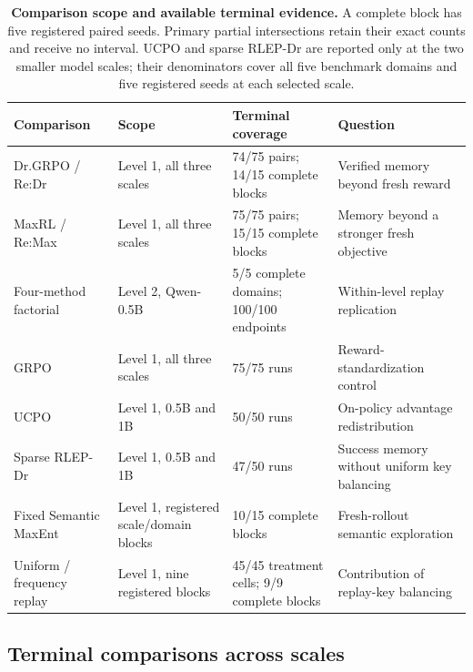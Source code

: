 \documentclass{article}
\newcommand{\1}{\mathbf 1}
\theoremstyle{remark}
\theoremstyle{definition}
\theoremstyle{plain}
\begin{document}
\begin{table}[H]
  \centering
  \caption{\textbf{Comparison scope and available terminal evidence.}
  A complete block has five registered paired seeds. Primary partial
  intersections retain their exact counts and receive no interval.
  UCPO and sparse RLEP-Dr are reported only at the two smaller model scales;
  their denominators cover all five benchmark domains and five registered
  seeds at each selected scale.}
  \label{tab:experiment-map}
  \label{tab:direct-comparators}
  \scriptsize
  \setlength{\tabcolsep}{3pt}
  \begin{tabularx}{\linewidth}{@{}P{.24\linewidth}P{.20\linewidth}P{.22\linewidth}Y@{}}
    \toprule
    \textbf{Comparison} & \textbf{Scope} & \textbf{Terminal coverage}
      & \textbf{Question} \\
    \midrule
    Dr.GRPO / Re:Dr & Level 1, all three scales &
      74/75 pairs; 14/15 complete blocks & Verified memory beyond fresh reward \\
    MaxRL / Re:Max & Level 1, all three scales &
      75/75 pairs; 15/15 complete blocks & Memory beyond a stronger fresh objective \\
    Four-method factorial & Level 2, Qwen-0.5B &
      5/5 complete domains; 100/100 endpoints & Within-level replay replication \\
    GRPO & Level 1, all three scales &
      75/75 runs & Reward-standardization control \\
    UCPO & Level 1, 0.5B and 1B &
      50/50 runs & On-policy advantage redistribution \\
    Sparse RLEP-Dr & Level 1, 0.5B and 1B &
      47/50 runs & Success memory without uniform key balancing \\
    Fixed Semantic MaxEnt & Level 1, registered scale/domain blocks &
      10/15 complete blocks & Fresh-rollout semantic exploration \\
    Uniform / frequency replay & Level 1, nine registered blocks &
      45/45 treatment cells; 9/9 complete blocks & Contribution of replay-key balancing \\
    \bottomrule
  \end{tabularx}
\end{table}


\subsection{Terminal comparisons across scales}
\label{app:scale-matrix}
\label{app:scale-snapshot}
\label{app:maxrl-scale-extensions}
\label{app:current-campaign-results}
\end{document}
